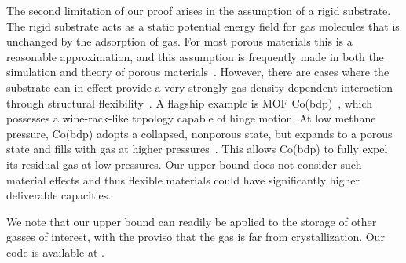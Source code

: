 
The second limitation of our proof arises in the assumption of a rigid substrate. The rigid substrate acts as a static potential energy field for gas molecules that is unchanged by the adsorption of gas.
For most porous materials this is a reasonable approximation, and this assumption is frequently made in both the simulation and theory of porous materials~\cite{witman2017influence}. However, there are cases where the substrate can in effect provide a very strongly gas-density-dependent interaction through structural flexibility~\cite{schneemann2014flexible}. A flagship example is MOF Co(bdp)~\cite{choi2008broadly}, which possesses a wine-rack-like topology capable of hinge motion. At low methane pressure, Co(bdp) adopts a collapsed, nonporous state, but expands to a porous state and fills with gas at higher pressures~\cite{mason2015methane}. This allows Co(bdp) to fully expel its residual gas at low pressures.
Our upper bound does not consider such material effects and thus flexible materials could have significantly higher deliverable capacities.

We note that our upper bound can readily be applied to the storage of other gasses of interest, with the proviso that the gas is far from crystallization. Our code is available at .





